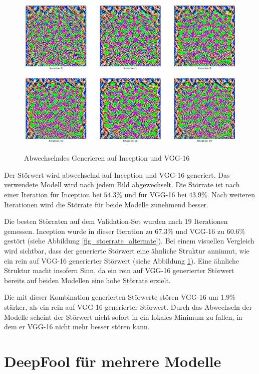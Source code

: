\documentclass{FFHS_Thesis_Additions/ffhsthesis}
\begin{document}
\begin{figure}[h]
\caption{Abwechselndes Generieren auf Inception und VGG-16}
\centering
\includegraphics[width=\textwidth]{./images/comb2_inception_vgg16.png}
\label{fig_stoerwerte_alternate}
\end{figure}


Der Störwert wird abwechselnd auf Inception und VGG-16 generiert. 
Das verwendete Modell wird nach jedem Bild abgewechselt. 
Die Störrate ist nach einer Iteration für Inception bei $54.3\%$ und für VGG-16 bei $43.9\%$. 
Nach weiteren Iterationen wird die Störrate für beide Modelle zunehmend besser.

Die besten Störraten auf dem Validation-Set wurden nach $19$ Iterationen gemessen. 
Inception wurde in dieser Iteration zu $67.3\%$ und VGG-16 zu $60.6\%$ gestört (siehe Abbildung \ref{fig_stoerrate_alternate}).
Bei einem visuellen Vergleich wird sichtbar, dass der generierte Störwert eine ähnliche Struktur annimmt, wie ein rein auf VGG-16 generierter Störwert (siehe Abbildung \ref{fig_stoerwerte_alternate}). Eine ähnliche Struktur macht insofern Sinn, da ein rein auf VGG-16 generierter Störwert bereits auf beiden Modellen eine hohe Störrate erzielt.

Die mit dieser Kombination generierten Störwerte stören VGG-16 um $1.9\%$ stärker, als ein rein auf VGG-16 generierter Störwert. Durch das Abwechseln der Modelle scheint der Störwert nicht sofort in ein lokales Minimum zu fallen, in dem er VGG-16 nicht mehr besser stören kann. 


    
\section{DeepFool für mehrere Modelle}
\end{document}
